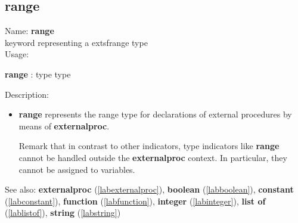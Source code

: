 \subsection{range}
\label{labrange}
\noindent Name: \textbf{range}\\
keyword representing a 	extsf{range} type \\
\noindent Usage: 
\begin{center}
\textbf{range} : \textsf{type type}
\end{center}
\noindent Description: \begin{itemize}

\item \textbf{range} represents the \textsf{range} type for declarations
   of external procedures by means of \textbf{externalproc}.
    
   Remark that in contrast to other indicators, type indicators like
   \textbf{range} cannot be handled outside the \textbf{externalproc} context.  In
   particular, they cannot be assigned to variables.
\end{itemize}
See also: \textbf{externalproc} (\ref{labexternalproc}), \textbf{boolean} (\ref{labboolean}), \textbf{constant} (\ref{labconstant}), \textbf{function} (\ref{labfunction}), \textbf{integer} (\ref{labinteger}), \textbf{list of} (\ref{lablistof}), \textbf{string} (\ref{labstring})
